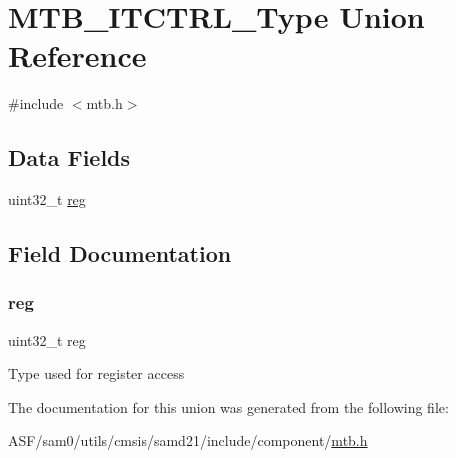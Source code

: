 \hypertarget{union_m_t_b___i_t_c_t_r_l___type}{}\section{M\+T\+B\+\_\+\+I\+T\+C\+T\+R\+L\+\_\+\+Type Union Reference}
\label{union_m_t_b___i_t_c_t_r_l___type}


{\ttfamily \#include $<$mtb.\+h$>$}

\subsection*{Data Fields}
\begin{DoxyCompactItemize}
\item 
uint32\+\_\+t \mbox{\hyperlink{union_m_t_b___i_t_c_t_r_l___type_a6b91636401516a477989a336376d7b40}{reg}}
\end{DoxyCompactItemize}


\subsection{Field Documentation}
\mbox{\label{union_m_t_b___i_t_c_t_r_l___type_a6b91636401516a477989a336376d7b40}} 
\subsubsection{\texorpdfstring{reg}{reg}}
{\footnotesize\ttfamily uint32\+\_\+t reg}

Type used for register access 

The documentation for this union was generated from the following file\+:\begin{DoxyCompactItemize}
\item 
A\+S\+F/sam0/utils/cmsis/samd21/include/component/\mbox{\hyperlink{component_2mtb_8h}{mtb.\+h}}\end{DoxyCompactItemize}
